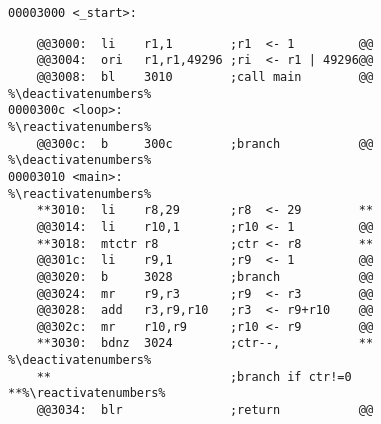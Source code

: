 \documentclass[varwidth]{standalone}
\makeatletter
\let\origthelstnumber\thelstnumber
\newcommand*\deactivatenumbers{%
  \lst@AddToHook{OnNewLine}{%
    \let\thelstnumber\relax%
    \advance\c@lstnumber-\@ne\relax}}
\newcommand*\reactivatenumbers{%
  \lst@AddToHook{OnNewLine}{%
    \let\thelstnumber\origthelstnumber%
    \advance\c@lstnumber\@ne\relax}}
\makeatother
\begin{document}
\scriptsize
\begin{lstlisting}[numbers=none]
00003000 <_start>:
\end{lstlisting}
\vspace{-12pt}
\begin{lstlisting}
    @@3000:  li    r1,1        ;r1  <- 1         @@
    @@3004:  ori   r1,r1,49296 ;ri  <- r1 | 49296@@
    @@3008:  bl    3010        ;call main        @@ %\deactivatenumbers%
0000300c <loop>:                                    %\reactivatenumbers%
    @@300c:  b     300c        ;branch           @@ %\deactivatenumbers%
00003010 <main>:                                    %\reactivatenumbers%
    **3010:  li    r8,29       ;r8  <- 29        **
    @@3014:  li    r10,1       ;r10 <- 1         @@
    **3018:  mtctr r8          ;ctr <- r8        **
    @@301c:  li    r9,1        ;r9  <- 1         @@
    @@3020:  b     3028        ;branch           @@
    @@3024:  mr    r9,r3       ;r9  <- r3        @@
    @@3028:  add   r3,r9,r10   ;r3  <- r9+r10    @@
    @@302c:  mr    r10,r9      ;r10 <- r9        @@
    **3030:  bdnz  3024        ;ctr--,           ** %\deactivatenumbers%
    **                         ;branch if ctr!=0 **%\reactivatenumbers%
    @@3034:  blr               ;return           @@
\end{lstlisting}
\end{document}
